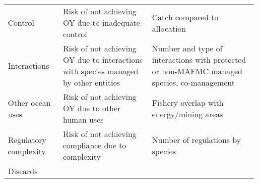 \documentclass[11pt,]{article}
\begin{document}
\begin{longtable}[]{@{}lll@{}}
\begin{minipage}[t]{0.25\columnwidth}
Control\strut
\end{minipage} & \begin{minipage}[t]{0.33\columnwidth}\raggedright\strut
Risk of not achieving OY due to inadequate control\strut
\end{minipage} & \begin{minipage}[t]{0.33\columnwidth}\raggedright\strut
Catch compared to allocation\strut
\end{minipage}\tabularnewline
\begin{minipage}[t]{0.25\columnwidth}\raggedright\strut
Interactions\strut
\end{minipage} & \begin{minipage}[t]{0.33\columnwidth}\raggedright\strut
Risk of not achieving OY due to interactions with species managed by
other entities\strut
\end{minipage} & \begin{minipage}[t]{0.33\columnwidth}\raggedright\strut
Number and type of interactions with protected or non-MAFMC managed
species, co-management\strut
\end{minipage}\tabularnewline
\begin{minipage}[t]{0.25\columnwidth}\raggedright\strut
Other ocean uses\strut
\end{minipage} & \begin{minipage}[t]{0.33\columnwidth}\raggedright\strut
Risk of not achieving OY due to other human uses\strut
\end{minipage} & \begin{minipage}[t]{0.33\columnwidth}\raggedright\strut
Fishery overlap with energy/mining areas\strut
\end{minipage}\tabularnewline
\begin{minipage}[t]{0.25\columnwidth}\raggedright\strut
Regulatory complexity\strut
\end{minipage} & \begin{minipage}[t]{0.33\columnwidth}\raggedright\strut
Risk of not achieving compliance due to complexity\strut
\end{minipage} & \begin{minipage}[t]{0.33\columnwidth}\raggedright\strut
Number of regulations by species\strut
\end{minipage}\tabularnewline
\begin{minipage}[t]{0.25\columnwidth}\raggedright\strut
Discards\strut
\end{minipage} & \begin{minipage}[t]{0.33\columnwidth}\raggedright\strut

\end{minipage}
\end{longtable}
\end{document}
